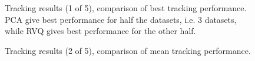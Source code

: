 \begin{figure}[t]
\centering

\caption{Tracking results (1 of 5), comparison of best tracking performance.  PCA give best performance for half the datasets, i.e. 3 datasets, while RVQ gives best performance for the other half.}
\label{fig:results_final_1_best}
\end{figure}

\begin{figure}[t]
\centering

\caption{Tracking results (2 of 5), comparison of mean tracking performance.}
\label{fig:results_final_2_mean}
\end{figure}


